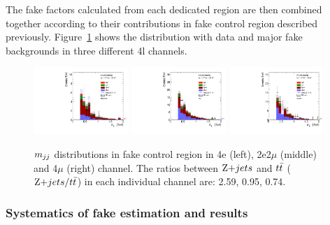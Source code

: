 The fake factors calculated from each dedicated region are then combined together according to their contributions in fake control region described previously.
Figure~\ref{fig:fake_mjj} shows the \mjj distribution with data and major fake backgrounds in three different 4l channels.
\begin{figure}[!htb]
  \centering
  \includegraphics[width=0.32\textwidth]{figures/VBSZZ/fakebkg/15161718_mva_dijet_mass_zjet_ttbar_ratio_electrons_mva_dijet_mass.pdf}
  \includegraphics[width=0.32\textwidth]{figures/VBSZZ/fakebkg/15161718_mva_dijet_mass_zjet_ttbar_ratio_mix_mva_dijet_mass.pdf}
  \includegraphics[width=0.32\textwidth]{figures/VBSZZ/fakebkg/15161718_mva_dijet_mass_zjet_ttbar_ratio_muons_mva_dijet_mass.pdf}
  \caption{$m_{jj}$ distributions in fake control region in 4e (left), 2e2$\mu$ (middle) and 4$\mu$ (right) channel.
The ratios between $\Zjet$ and $t\bar{t}$ ($\Zjet / \ttbar$) in each individual channel are: 2.59, 0.95, 0.74.}
  \label{fig:fake_mjj}
\end{figure}
\fi

\subsubsection{Systematics of fake estimation and results}
\label{sec:fake_syst}

